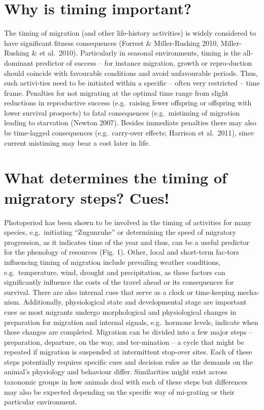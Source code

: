 \documentclass[
]{book}
\begin{document}
\hypertarget{why-is-timing-important}{%
\section{Why is timing important?}\label{why-is-timing-important}}

The timing of migration (and other life-history activities) is widely considered to have significant fitness consequences (Forrest \& Miller-Rushing 2010, Miller-Rushing \& et al.~2010). Particularly in seasonal environments, timing is the all-dominant predictor of success -- for instance migration, growth or repro-duction should coincide with favourable conditions and avoid unfavourable periods. Thus, such activi-ties need to be initiated within a specific -- often very restricted -- time frame.
Penalties for not migrating at the optimal time range from slight reductions in reproductive success (e.g.~raising fewer offspring or offspring with lower survival prospects) to fatal consequences (e.g.~mistiming of migration leading to starvation (Newton 2007). Besides immediate penalties there may also be time-lagged consequences (e.g.~carry-over effects; Harrison et al.~2011), since current mistiming may bear a cost later in life.

\hypertarget{what-determines-the-timing-of-migratory-steps-cues}{%
\section{What determines the timing of migratory steps? Cues!}\label{what-determines-the-timing-of-migratory-steps-cues}}

Photoperiod has been shown to be involved in the timing of activities for many species, e.g.~initiating ``Zugunruhe'' or determining the speed of migratory progression, as it indicates time of the year and thus, can be a useful predictor for the phenology of resources (Fig. 1). Other, local and short-term fac-tors influencing timing of migration include prevailing weather conditions, e.g.~temperature, wind, drought and precipitation, as these factors can significantly influence the costs of the travel ahead or its consequences for survival. There are also internal cues that serve as a clock or time-keeping mecha-nism. Additionally, physiological state and developmental stage are important cues as most migrants undergo morphological and physiological changes in preparation for migration and internal signals, e.g.~hormone levels, indicate when these changes are completed.
Migration can be divided into a few major steps -- preparation, departure, on the way, and ter-mination -- a cycle that might be repeated if migration is suspended at intermittent stop-over sites. Each of these steps potentially requires specific cues and decision rules as the demands on the animal's physiology and behaviour differ. Similarities might exist across taxonomic groups in how animals deal with each of these steps but differences may also be expected depending on the specific way of mi-grating or their particular environment.
\end{document}
